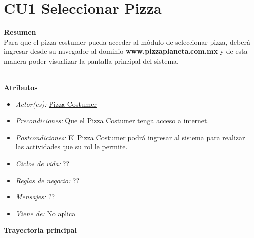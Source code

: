 
\pagebreak
\hypertarget{CU1}{}
\section{CU1 Seleccionar Pizza}

	\noindent \textbf{Resumen}\\

		Para que el pizza costumer pueda acceder al módulo de seleccionar pizza, deberá ingresar desde su navegador al dominio {\textbf{www.pizzaplaneta.com.mx}} y de esta manera poder visualizar la pantalla principal del sistema.

	\noindent \textbf{\\Atributos}

		\begin{itemize}

			\item \textit{Actor(es):} \hyperlink{A:Pizza Costumer}{Pizza Costumer}
			\item \textit{Precondiciones:} Que el \hyperlink{A:Pizza Costumer}{Pizza Costumer} tenga acceso a internet. 
			\item \textit{Postcondiciones:} El \hyperlink{A:Pizza Costumer}{Pizza Costumer} podrá ingresar al sistema para realizar las actividades que su rol le permite.
			\item \textit{Ciclos de vida:} ??
			\item \textit{Reglas de negocio:} ??
			\item \textit{Mensajes:} ??
			\item \textit{Viene de:} No aplica

		\end{itemize} 

	\noindent \textbf{Trayectoria principal}

